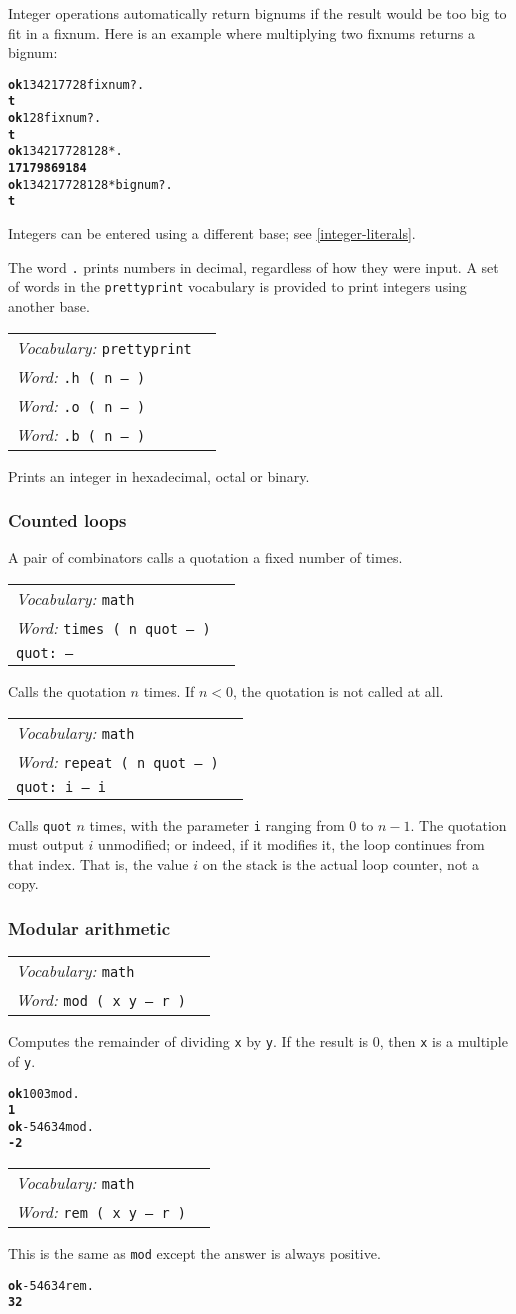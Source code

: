 \documentclass{book}
\newcommand{\vocabulary}[1]{\emph{Vocabulary:} \texttt{#1}&\\}
\newcommand{\ordinaryword}[2]{\index{\texttt{#1}}\emph{Word:} \texttt{#2}&\\}
\newcommand{\wordtable}[1]{

\begin{tabularx}{12cm}[t]{lX}
\hline
#1
\hline
\end{tabularx}

}
\begin{document}
Integer operations automatically return bignums if the result would be too big to fit in a fixnum. Here is an example where multiplying two fixnums returns a bignum:

\begin{alltt}
\textbf{ok} 134217728 fixnum? .
\textbf{t}
\textbf{ok} 128 fixnum? .
\textbf{t}
\textbf{ok} 134217728 128 * .
\textbf{17179869184}
\textbf{ok} 134217728 128 * bignum? .
\textbf{t}
\end{alltt}

Integers can be entered using a different base; see \ref{integer-literals}.

The word \texttt{.} prints numbers in decimal, regardless of how they were input. A set of words in the \texttt{prettyprint} vocabulary is provided to print integers using another base.

\wordtable{
\vocabulary{prettyprint}
\ordinaryword{.h}{.h ( n -- )}
\ordinaryword{.o}{.o ( n -- )}
\ordinaryword{.b}{.b ( n -- )}

}
Prints an integer in hexadecimal, octal or binary.

\subsubsection{Counted loops}

A pair of combinators calls a quotation a fixed number of times.

\wordtable{
\vocabulary{math}
\ordinaryword{times}{times ( n quot -- )}
\texttt{quot:~-- }\\
}
Calls the quotation $n$ times. If $n<0$, the quotation is not called at all.

\wordtable{
\vocabulary{math}
\ordinaryword{repeat}{repeat ( n quot -- )}
\texttt{quot:~i -- i }\\
}
Calls \texttt{quot} $n$ times, with the parameter \texttt{i} ranging from 0 to $n-1$. The quotation must output $i$ unmodified; or indeed, if it modifies it, the loop continues from that index. That is, the value $i$ on the stack is the actual loop counter, not a copy.

\subsubsection{Modular arithmetic}

\wordtable{
\vocabulary{math}
\ordinaryword{mod}{mod ( x y -- r )}
}
Computes the remainder of dividing \texttt{x} by \texttt{y}. If the result is 0, then \texttt{x} is a multiple of \texttt{y}.
\begin{alltt}
\textbf{ok} 100 3 mod .
\textbf{1}
\textbf{ok} -546 34 mod .
\textbf{-2}
\end{alltt}
\wordtable{
\vocabulary{math}
\ordinaryword{rem}{rem ( x y -- r )}
}
This is the same as \texttt{mod} except the answer is always positive.
\begin{alltt}
\textbf{ok} -546 34 rem .
\textbf{32}
\end{alltt}
\end{document}
